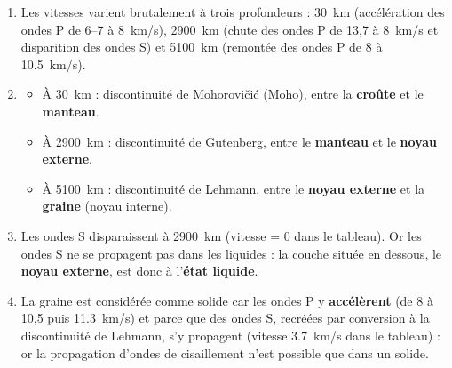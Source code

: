 \documentclass[11pt]{article}
\newcommand{\cle}[1]{{\popxbold\color{popdark}#1}}
\begin{document}
\begin{corrige}
\begin{enumerate}
\item Les vitesses varient brutalement à trois profondeurs : \SI{30}{km} (accélération des ondes P de 6--7 à \SI{8}{km/s}), \SI{2900}{km} (chute des ondes P de 13,7 à \SI{8}{km/s} et disparition des ondes S) et \SI{5100}{km} (remontée des ondes P de 8 à \SI{10,5}{km/s}).
\item \begin{itemize}
\item À \SI{30}{km} : discontinuité de \cle{Mohorovičić} (Moho), entre la \textbf{croûte} et le \textbf{manteau}.
\item À \SI{2900}{km} : discontinuité de \cle{Gutenberg}, entre le \textbf{manteau} et le \textbf{noyau externe}.
\item À \SI{5100}{km} : discontinuité de \cle{Lehmann}, entre le \textbf{noyau externe} et la \textbf{graine} (noyau interne).
\end{itemize}
\item Les ondes S disparaissent à \SI{2900}{km} (vitesse = 0 dans le tableau). Or les ondes S ne se propagent pas dans les liquides : la couche située en dessous, le \textbf{noyau externe}, est donc à l'\textbf{état liquide}.
\item La graine est considérée comme solide car les ondes P y \textbf{accélèrent} (de 8 à 10,5 puis \SI{11,3}{km/s}) et parce que des ondes S, recréées par conversion à la discontinuité de Lehmann, s'y propagent (vitesse \SI{3,7}{km/s} dans le tableau) : or la propagation d'ondes de cisaillement n'est possible que dans un solide.
\end{enumerate}
\end{corrige}
\end{document}
